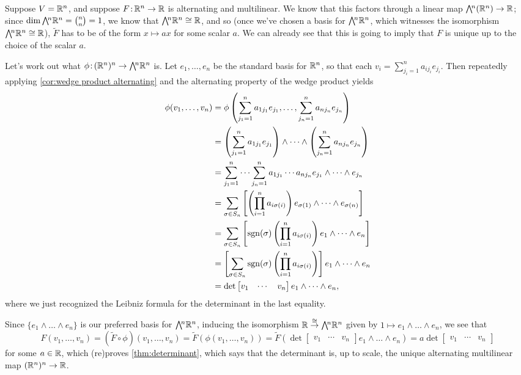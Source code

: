 \begin{example}
	Suppose $V = \mathbb{R}^n$, and suppose $F \colon\thinspace\!\! \mathbb{R}^n \to \mathbb{R}$ is alternating and multilinear. We know that this factors through a linear map $\ext{n}(\R^n) \to \R$; since $\dim \ext{n}\R^n = \binom{n}{n} = 1$, we know that $\ext{n}\R^n \cong \R$, and so (once we've chosen a basis for $\ext{n}\R^n$, which witnesses the isomorphism $\ext{n}\R^n \cong \R$), $\widetilde{F}$ has to be of the form $x \mapsto ax$ for some scalar $a$. We can already see that this is going to imply that $F$ is unique up to the choice of the scalar $a$.
	
	Let's work out what $\phi \from (\R^n)^n \to \ext{n}\R^n$ is. Let $e_1, \dots , e_n$ be the standard basis for $\mathbb{R}^n$, so that each $v_i = \sum_{j_i=1}^n a_{ij_i} e_{j_i}$. Then repeatedly applying \cref{cor:wedge product alternating} and the alternating property of the wedge product yields
	\begin{align*}
		\phi(v_1, \dots , v_n) & = \phi\left(\sum_{j_1=1}^n a_{1j_1}e_{j_1}, \dots , \sum_{j_n=1}^n a_{nj_n}e_{j_n}\right)  \\
		& = \left(\sum_{j_1=1}^n a_{1j_1}e_{j_1}\right) \wedge \dots \wedge \left(\sum_{j_n=1}^n a_{nj_n} e_{j_n}\right) \\
		& = \sum_{j_1=1}^n \dots \sum_{j_n=1}^n a_{1j_1} \cdots a_{n j_n} e_{j_1} \wedge \dots \wedge e_{j_n} \\
		& = \sum_{\sigma \in S_n} \left[ \left(\prod_{i=1}^n a_{i \sigma(i)}\right) e_{\sigma(1)} \wedge \dots \wedge e_{\sigma(n)}\right]  \\
		& = \sum_{\sigma \in S_n} \left[ \operatorname{sgn}(\sigma) \left(\prod_{i=1}^n a_{i\sigma(i)}\right) e_1 \wedge \dots \wedge e_n \right] \\
		& = \left[ \sum_{\sigma \in S_n} \operatorname{sgn}(\sigma) \left(\prod_{i=1}^n a_{i\sigma(i)}\right)\right] e_1 \wedge \dots \wedge e_n  \\
		& = \det \begin{bmatrix} v_1 & \cdots & v_n \end{bmatrix} e_1 \wedge \dots \wedge e_n,
	\end{align*}
	where we just recognized the Leibniz formula for the determinant in the last equality.
	
	Since $\{e_1 \wedge \dots \wedge e_n\}$ is our preferred basis for $\ext{n}\R^n$, inducing the isomorphism $\R \overset{\cong}{\to} \ext{n}\R^n$ given by $1 \mapsto e_1 \wedge \dots \wedge e_n$, we see that
	\[
		F(v_1, \dots , v_n) = (\widetilde{F} \circ \phi)(v_1, \dots , v_n) = \widetilde{F}(\phi(v_1, \dots , v_n)) = \widetilde{F}(\det \begin{bmatrix} v_1 & \cdots & v_n \end{bmatrix} e_1 \wedge \dots \wedge e_n) = a \det \begin{bmatrix} v_1 & \cdots & v_n \end{bmatrix}
	\]
	for some $a \in \mathbb{R}$, which (re)proves \cref{thm:determinant}, which says that the determinant is, up to scale, the unique alternating multilinear map $(\mathbb{R}^n)^n \to \mathbb{R}$.
\end{example}

